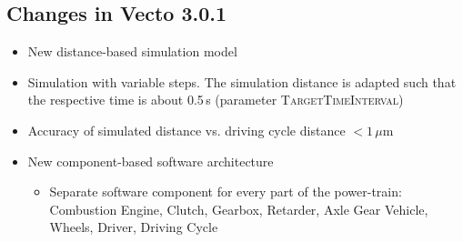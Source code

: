 \subsection{Changes in Vecto 3.0.1} %
\label{ssub:changes_in_vecto_3_0_1}

\begin{itemize}
	\item New distance-based simulation model
	\item Simulation with variable steps. The simulation distance is adapted such that the respective time is about 0.5\,s (parameter \textsc{TargetTimeInterval})
	\item Accuracy of simulated distance vs. driving cycle distance $< 1\,\mu\textrm{m}$
	\item New component-based software architecture
	\begin{itemize}
		\item Separate software component for every part of the power-train:
		Combustion Engine,
		Clutch,
		Gearbox,
		Retarder,
		Axle Gear
		Vehicle,
		Wheels,
		Driver,
		Driving Cycle


\end{itemize}
\end{itemize}
